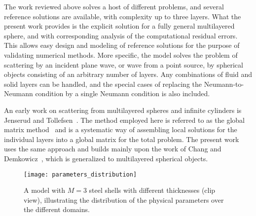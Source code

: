 The work reviewed above solves a host of different problems, and several reference solutions are available, with complexity up to three layers. What the present work provides is the explicit solution for a fully general multilayered sphere, and with corresponding analysis of the computational residual errors. This allows easy design and modeling of reference solutions for the purpose of validating numerical methods.
More specific, the model solves the problem of scattering by an incident plane wave, or wave from a point source, by spherical objects consisting of an arbitrary number of layers. Any combinations of fluid and solid layers can be handled, and the special cases of replacing the Neumann-to-Neumann condition by a single Neumann condition is also included.

An early work on scattering from multilayered spheres and infinite cylinders is Jenserud and Tollefsen~\cite{Jenserud1990ars}. The method employed here is referred to as the global matrix method~\cite{Schmidt1985afw} and is a systematic way of assembling local solutions for the individual layers into a global matrix for the total problem. 
The present work uses the same approach and builds mainly upon the work of Chang and Demkowicz~\cite{Chang1994voa}, which is generalized to multilayered spherical objects.

\begin{figure}
	\centering
	\texttt{[image: parameters\_distribution]}
	\caption{A model with $M=3$ steel shells with different thicknesses (clip view), illustrating the distribution of the physical parameters over the different domains.}
	\label{Fig1:illustration}
\end{figure}